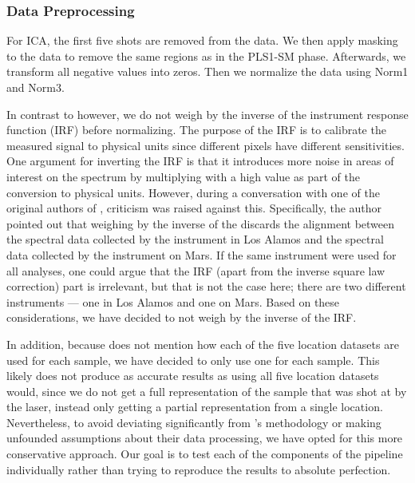 \subsubsection{Data Preprocessing}\label{sec:ica_data_preprocessing}
For ICA, the first five shots are removed from the data.
We then apply masking to the data to remove the same regions as in the PLS1-SM phase.
Afterwards, we transform all negative values into zeros.
Then we normalize the data using Norm1 and Norm3.

In contrast to \citet{cleggRecalibrationMarsScience2017} however, we do not weigh by the inverse of the instrument response function (IRF) before normalizing.
The purpose of the IRF is to calibrate the measured signal to physical units since different pixels have different sensitivities\cite{wiensChemcam2012}.
One argument for inverting the IRF is that it introduces more noise in areas of interest on the spectrum by multiplying with a high value as part of the conversion to physical units.
However, during a conversation with one of the original authors of \citet{cleggRecalibrationMarsScience2017}, criticism was raised against this.
Specifically, the author pointed out that weighing by the inverse of the discards the alignment between the spectral data collected by the instrument in Los Alamos and the spectral data collected by the instrument on Mars.
If the same instrument were used for all analyses, one could argue that the IRF (apart from the inverse square law correction) part is irrelevant, but that is not the case here; there are two different instruments --- one in Los Alamos and one on Mars.
Based on these considerations, we have decided to not weigh by the inverse of the IRF.

In addition, because \citet{cleggRecalibrationMarsScience2017} does not mention how each of the five location datasets are used for each sample, we have decided to only use one for each sample.
This likely does not produce as accurate results as using all five location datasets would, since we do not get a full representation of the sample that was shot at by the laser, instead only getting a partial representation from a single location.
Nevertheless, to avoid deviating significantly from \citet{cleggRecalibrationMarsScience2017}'s methodology or making unfounded assumptions about their data processing, we have opted for this more conservative approach.
Our goal is to test each of the components of the pipeline individually rather than trying to reproduce the results to absolute perfection.

